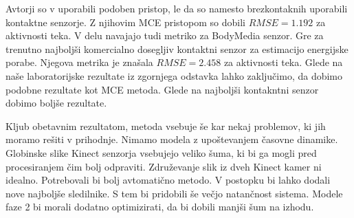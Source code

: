 Avtorji so v \cite{gjoreski2015context} uporabili podoben pristop, le da so namesto brezkontaknih uporabili kontaktne senzorje. Z njihovim MCE pristopom so dobili $RMSE=1.192$ za aktivnosti teka. V delu navajajo tudi metriko za BodyMedia senzor. Gre za trenutno najboljši komercialno dosegljiv kontaktni senzor za estimacijo energijske porabe. Njegova metrika je znašala $RMSE=2.458$ za aktivnosti teka. Glede na naše laboratorijske rezultate iz zgornjega odstavka lahko zaključimo, da dobimo podobne rezultate kot MCE metoda. Glede na najboljši kontakntni senzor dobimo boljše rezultate.

Kljub obetavnim rezultatom, metoda vsebuje še kar nekaj problemov, ki jih moramo rešiti v prihodnje. Nimamo modela z upoštevanjem časovne dinamike. Globinske slike Kinect senzorja vsebujejo veliko šuma, ki bi ga mogli pred procesiranjem čim bolj odpraviti. Združevanje slik iz dveh Kinect kamer ni idealno. Potrebovali bi bolj avtomatično metodo. V postopku bi lahko dodali nove najboljše sledilnike. S tem bi pridobili še večjo natančnost sistema. Modele faze 2 bi morali dodatno optimizirati, da bi dobili manjši šum na izhodu.